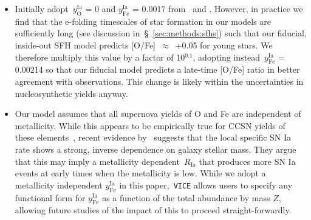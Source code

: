 \documentclass[fleqn, usenatbib]{mnras}
\begin{document}
\begin{itemize}
\begin{itemize}
		\item Initially adopt~$y_\text{O}^\text{Ia}$ = 0 and 
		$y_\text{Fe}^\text{Ia}$ = 0.0017 from~\citet{Johnson2020} and 
		\citet{Weinberg2017}. However, in practice we find that the e-folding 
		timescales of star formation in our models are sufficiently long (see 
		discussion in~\S~\ref{sec:methods:sfhs}) such that our fiducial, 
		inside-out SFH model predicts [O/Fe]~$\approx$~+0.05 for 
		young stars. We therefore multiply this value by a factor of 
		10$^{0.1}$, adopting instead~$y_\text{Fe}^\text{Ia}$ = 0.00214 so 
		that our fiducial model predicts a late-time [O/Fe] ratio in better 
		agreement with observations. This change is likely within the 
		uncertainties in nucleosynthetic yields anyway. 

		\item Our model assumes that all supernova yields of O and Fe are 
		independent of metallicity. While this appears to be empirically true 
		for CCSN yields of these elements~\citep[e.g.][]{Weinberg2019, 
		Griffith2020}, recent evidence by~\citet{Brown2019} suggests that 
		the local specific SN Ia rate shows a strong, inverse dependence on 
		galaxy stellar mass. They argue that this may imply a metallicity 
		dependent~$R_\text{Ia}$ that produces more SN Ia events at early times 
		when the metallicity is low. While we adopt a metallicity independent 
		$y_\text{Fe}^\text{Ia}$ in this paper,~\texttt{VICE} allows users to 
		specify any functional form for $y_\text{Fe}^\text{Ia}$ as a function 
		of the total abundance by mass $Z$, allowing future studies of the 
		impact of this to proceed straight-forwardly. 
	\end{itemize} 


\end{itemize}
\end{document}
